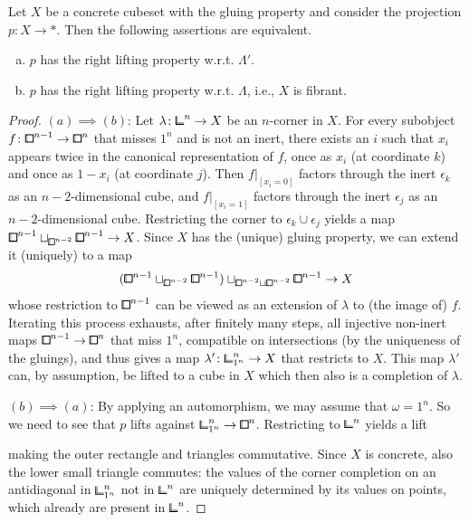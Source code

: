 \begin{lemma}\label{lem:alternative-nilfibrant-concrete}
Let $X$ be a concrete cubeset with the gluing property and consider the projection $p\colon X\to\ast$.
Then the following assertions are equivalent.
\begin{enumerate}[(a)]
    \item $p$ has the right lifting property w.r.t. $\Lambda'$.
    \item $p$ has the right lifting property w.r.t. $\Lambda$, i.e., $X$ is fibrant.
\end{enumerate}
\end{lemma}

\begin{proof}
$(a)\implies(b)$:
Let $\lambda\colon{\bbcor}^n\to X$ be an $n$-corner in $X$.
For every subobject $f\colon{\bbox}^{n-1}\to{\bbox}^n$ that misses $1^n$ and is not an inert,
there exists an $i$ such that $x_i$ appears twice in the canonical representation of $f$,
once as $x_i$ (at coordinate $k$) and once as $1-x_i$ (at coordinate $j$).
Then $f\lvert_{[x_i=0]}$ factors through the inert $\epsilon_k$ as an $n-2$-dimensional cube,
and $f\lvert_{[x_i=1]}$ factors through the inert $\epsilon_j$ as an $n-2$-dimensional cube.
Restricting the corner to $\epsilon_k\cup\epsilon_j$ yields a map ${\bbox}^{n-1}\sqcup_{{\bbox}^{n-2}}{\bbox}^{n-1}\to X$.
Since $X$ has the (unique) gluing property, we can extend it (uniquely) to a map
\[
    ({\bbox}^{n-1}\sqcup_{{\bbox}^{n-2}}{\bbox}^{n-1})\sqcup_{{\bbox}^{n-2}\sqcup{\bbox}^{n-2}}{\bbox}^{n-1}\to X
\]
whose restriction to ${\bbox}^{n-1}$ can be viewed as an extension of $\lambda$ to (the image of) $f$.
Iterating this process exhausts, after finitely many steps, all injective non-inert maps ${\bbox}^{n-1}\to{\bbox}^n$ that miss $1^n$,
compatible on intersections (by the uniqueness of the gluings),
and thus gives a map $\lambda'\colon{\bbcor}^n_{1^n}\to X$ that restricts to $X$.
This map $\lambda'$ can, by assumption, be lifted to a cube in $X$ which then also is a completion of $\lambda$.

$(b)\implies(a)$:
By applying an automorphism, we may assume that $\omega = 1^n$.
So we need to see that $p$ lifts against ${\bbcor}^n_{1^n}\to{\bbox}^n$.
Restricting to ${\bbcor}^n$ yields a lift
\begin{center}
\end{center}
making the outer rectangle and triangles commutative.
Since $X$ is concrete, also the lower small triangle commutes:
the values of the corner completion on an antidiagonal in ${\bbcor}^n_{1^n}$ not in ${\bbcor}^n$
are uniquely determined by its values on points, which already are present in ${\bbcor}^n$.
\end{proof}

